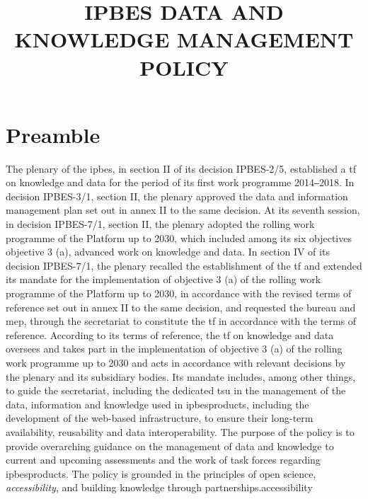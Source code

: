 \documentclass{article}
\title{IPBES DATA AND KNOWLEDGE MANAGEMENT POLICY}
\begin{document}


% 


\tableofcontents

\newpage





\section{Preamble}

The \gls{plenary} of the \gls{ipbes}, in section II of its decision IPBES-2/5, established a \gls{tf} on knowledge and data for the period of its first work programme 2014‒2018. In decision IPBES-3/1, section II, the \gls{plenary} approved the data and information management plan set out in annex II to the same decision. At its seventh session, in decision IPBES-7/1, section II, the \gls{plenary} adopted the rolling work programme of the Platform up to 2030, which included among its six objectives objective 3 (a), advanced work on knowledge and data. In section IV of its decision IPBES-7/1, the \gls{plenary} recalled the establishment of the \gls{tf} and extended its mandate for the implementation of objective 3 (a) of the rolling work programme of the Platform up to 2030, in accordance with the revised terms of reference set out in annex II to the same decision, and requested the \gls{bureau} and \gls{mep}, through the \gls{secretariat} to constitute the \gls{tf} in accordance with the terms of reference. According to its terms of reference, the \gls{tf} on knowledge and data oversees and takes part in the implementation of objective 3 (a) of the rolling work programme up to 2030 and acts in accordance with relevant decisions by the \gls{plenary} and its subsidiary bodies. Its mandate includes, among other things, to guide the \gls{secretariat}, including the dedicated \gls{tsu} in the management of the \gls{data}, information and \gls{knowledge} used in \glspl{ipbesproduct}, including the development of the web-based infrastructure, to ensure their long-term availability, reusability and data interoperability. The purpose of the policy is to provide overarching guidance on the management of data and knowledge to current and upcoming assessments and the work of task forces regarding \glspl{ipbesproduct}. The policy is grounded in the principles of open science, \textit{accessibility}, and building knowledge through partnerships.accessibility
\end{document}
